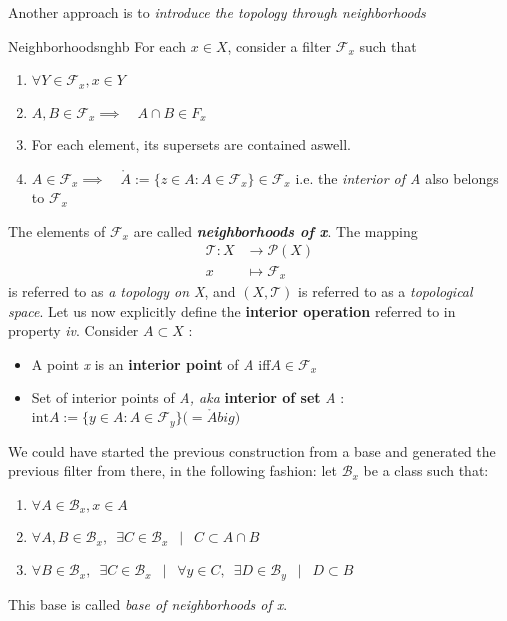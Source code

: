 Another approach is to \textit{introduce the topology through neighborhoods}
\begin{mydef}{Neighborhoods}{nghb}
	For each $x\in X$, consider a filter $\mathcal{F}_{x}$ such that
	\begin{enumerate}[label=\roman*.]
		\item $\forall Y \in \mathcal{F}_{x}, x \in Y \enspace$
		\item $A, B \in \mathcal{F}_x \implies \quad A \cap B \in F_x$
		\item For each element, its supersets are contained aswell.
		\item $A \in \mathcal{F}_x \implies \quad \mathring{A} := \{z \in A : A\in \mathcal{F}_x\} \in \mathcal{F}_x$ i.e. the \textit{interior of A} also belongs to $\mathcal{F}_x$
	\end{enumerate}
	The elements of $\mathcal{F}_x$ are called \textbf{\textit{neighborhoods of x}}. The mapping
	\begin{align*}
		\mathcal{T} : X &\to \mathcal{P}(X)\\
			 x &\mapsto \mathcal{F}_x
	\end{align*}
	is referred to as \textit{a topology on X}, and $(X, \mathcal{T})$ is referred to as a \textit{topological space}. Let us now explicitly define the \textbf{interior operation} referred to in property \textit{iv}. Consider $A \subset X$ :
	\begin{itemize}
		\item A point \textit{x} is an \textbf{interior point} of \textit{A} iff$A \in \mathcal{F}_x$
		\item Set of interior points of \textit{A, aka} \textbf{interior of set} \textit{A} \enspace: $ \text{int} A := \{y\in A : A\in \mathcal{F}_y\} \big(= \mathring{A} big)$
	\end{itemize}
	\tcblower
	We could have started the previous construction from a base and generated the previous filter from there, in the following fashion: let $\mathcal{B}_x$ be a class such that:
	\begin{enumerate}[label = \roman*.]
		\item $\forall A \in \mathcal{B}_x, x\in A$
		\item $\forall A, B \in \mathcal{B}_x, \enspace \exists C \in \mathcal{B}_x \enspace \mid \enspace C \subset A \cap B$
		\item $\forall B \in \mathcal{B}_x, \enspace \exists C \in \mathcal{B}_x \enspace \mid \enspace \forall y\in C, \enspace \exists D \in \mathcal{B}_y \enspace \mid \enspace D \subset B$
	\end{enumerate}
	This base is called \textit{base of neighborhoods of x}.
\end{mydef}
